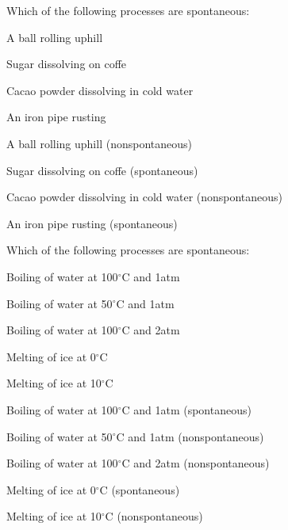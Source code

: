 \documentclass[main.tex]{subfiles}
\begin{document}
\begin{multicols*}{2}
\begin{question}[ID=\the\value{numA}]
Which of the following processes are spontaneous:
\begin{inparaenum}[(a)]
\item A ball rolling uphill %
\item Sugar dissolving on coffe %
\item Cacao powder dissolving in cold water %
\item An iron pipe rusting %
 \end{inparaenum}
\end{question}
\begin{solution}
\begin{inparaenum}[(a)]
\item A ball rolling uphill   (nonspontaneous)
\item Sugar dissolving on coffe   (spontaneous)
\item Cacao powder dissolving in cold water   (nonspontaneous)
\item An iron pipe rusting   (spontaneous)
\end{inparaenum}
\hspace{0.1cm}\end{solution}%


\begin{question}[ID=\the\value{numA}]
Which of the following processes are spontaneous:
\begin{inparaenum}[(a)]
\item Boiling of water at 100$^{\circ}$C and 1atm %
\item Boiling of water at 50$^{\circ}$C and 1atm %
\item Boiling of water at 100$^{\circ}$C and 2atm %
\item Melting of ice at 0$^{\circ}$C %
\item Melting of ice at 10$^{\circ}$C %
 \end{inparaenum}
\end{question}
\begin{solution}
\begin{inparaenum}[(a)]
\item Boiling of water at 100$^{\circ}$C and 1atm  (spontaneous)
\item Boiling of water at 50$^{\circ}$C and 1atm   (nonspontaneous)
\item Boiling of water at 100$^{\circ}$C and 2atm   (nonspontaneous)
\item Melting of ice at 0$^{\circ}$C   (spontaneous)
\item Melting of ice at 10$^{\circ}$C   (nonspontaneous)
\end{inparaenum}
\hspace{0.1cm}\end{solution}%





\end{multicols*}
\end{document}
